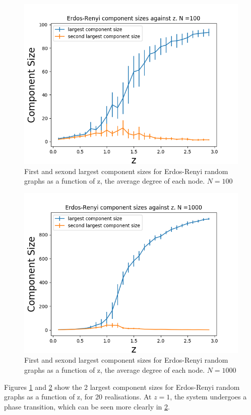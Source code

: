 \documentclass{article}
\begin{document}
\begin{figure}[H]
\includegraphics[scale=0.8]{erdos_a.png} 
\caption{First and sexond largest component sizes for Erdos-Renyi random graphs as a function of z, the average degree of each node. $N=100$} 
\label{fig:erdos_100}
\end{figure}


\begin{figure}[H]
\includegraphics[scale=0.8]{erdos_1000_a.png} 
\caption{First and sexond largest component sizes for Erdos-Renyi random graphs as a function of z, the average degree of each node. $N=1000$} 
\label{fig:erdos_1000}
\end{figure}

Figures \ref{fig:erdos_100} and \ref{fig:erdos_1000} show the 2 largest component sizes for Erdos-Renyi random graphs as a function of z, for 20 realisations. At $z=1$, the system undergoes a phase transition, which can be seen more clearly in \ref{fig:erdos_1000}. 
\end{document}
